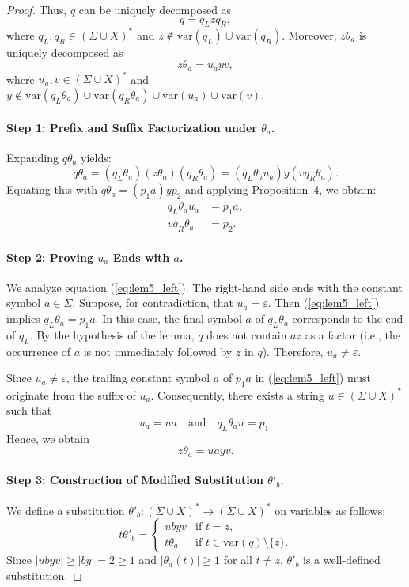 {\begin{proof}
Thus, $q$ can be uniquely decomposed as
\[
q = q_L z q_R,
\]
where $q_L, q_R \in (\Sigma \cup X)^*$ and $z \notin \mathrm{var}(q_L) \cup \mathrm{var}(q_R)$. Moreover, $z\theta_a$ is uniquely decomposed as
\[
z\theta_a = u_a y v,
\]
where $u_a, v \in (\Sigma \cup X)^*$ and $y \notin \mathrm{var}(q_L\theta_a) \cup \mathrm{var}(q_R\theta_a) \cup \mathrm{var}(u_a) \cup \mathrm{var}(v)$.

\paragraph{Step 1: Prefix and Suffix Factorization under $\theta_a$.}
Expanding $q\theta_a$ yields:
\[
q\theta_a = (q_L\theta_a)(z\theta_a)(q_R\theta_a) = (q_L\theta_a u_a) y (v q_R\theta_a).
\]
Equating this with $q\theta_a = (p_1 a) y p_2$ and applying Proposition~4, we obtain:
\begin{align}
q_L\theta_a u_a &= p_1 a, \label{eq:lem5_left}\\
v q_R\theta_a &= p_2. \label{eq:lem5_right}
\end{align}

\paragraph{Step 2: Proving $u_a$ Ends with $a$.}
We analyze equation (\ref{eq:lem5_left}). The right-hand side ends with the constant symbol $a \in \Sigma$.
Suppose, for contradiction, that $u_a = \varepsilon$. Then (\ref{eq:lem5_left}) implies $q_L\theta_a = p_1 a$.
In this case, the final symbol $a$ of $q_L\theta_a$ corresponds to the end of $q_L$. By the hypothesis of the lemma, $q$ does not contain $az$ as a factor (i.e., the occurrence of $a$ is not immediately followed by $z$ in $q$). Therefore, $u_a \neq \varepsilon$.

Since $u_a \neq \varepsilon$, the trailing constant symbol $a$ of $p_1 a$ in (\ref{eq:lem5_left}) must originate from the suffix of $u_a$. Consequently, there exists a string $u \in (\Sigma \cup X)^*$ such that
\begin{equation}\label{eq:lem5_u_decomp}
u_a = ua \quad \text{and} \quad q_L\theta_a u = p_1.
\end{equation}
Hence, we obtain
\begin{equation}\label{eq:lem5_z_theta_a}
z\theta_a = u a y v.
\end{equation}

\paragraph{Step 3: Construction of Modified Substitution $\theta'_b$.}
We define a substitution $\theta'_b \colon (\Sigma \cup X)^* \to (\Sigma \cup X)^*$ on variables as follows:
\[
t\theta'_b = 
\begin{cases}
u b y v & \text{if } t = z, \\
t\theta_a & \text{if } t \in \mathrm{var}(q) \setminus \{z\}.
\end{cases}
\]
Since $|u b y v| \ge |b y| = 2 \ge 1$ and $|\theta_a(t)| \ge 1$ for all $t \neq z$, $\theta'_b$ is a well-defined substitution.


\end{proof}}

